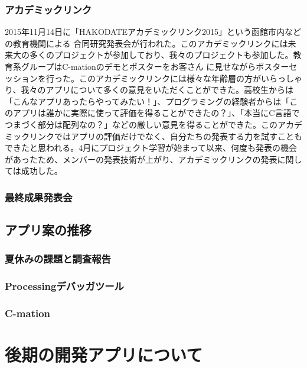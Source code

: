 \documentclass[openany,11pt,papersize]{jsbook}
\begin{document}
\subsection{アカデミックリンク}
2015年11月14日に「HAKODATEアカデミックリンク2015」という函館市内などの教育機関による
合同研究発表会が行われた。このアカデミックリンクには未来大の多くのプロジェクトが参加しており、我々のプロジェクトも参加した。教育系グループはC-mationのデモとポスターをお客さん
に見せながらポスターセッションを行った。このアカデミックリンクには様々な年齢層の方がいらっしゃり、我々のアプリについて多くの意見をいただくことができた。高校生からは「こんなアプリあったらやってみたい！」、プログラミングの経験者からは「このアプリは誰かに実際に使って評価を得ることができたの？」、「本当にC言語でつまづく部分は配列なの？」などの厳しい意見を得ることができた。このアカデミックリンクではアプリの評価だけでなく、自分たちの発表する力を試すこともできたと思われる。4月にプロジェクト学習が始まって以来、何度も発表の機会があったため、メンバーの発表技術が上がり、アカデミックリンクの発表に関しては成功した。

\subsection{最終成果発表会}


\section{アプリ案の推移}

\subsection{夏休みの課題と調査報告}

\subsection{Processingデバッガツール}

\subsection{C-mation}



\chapter{後期の開発アプリについて}
\end{document}
